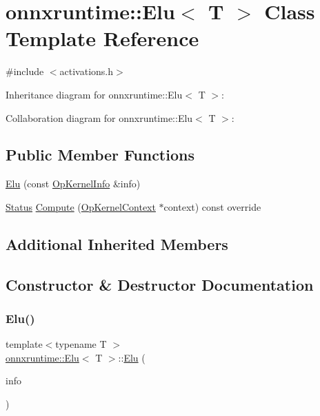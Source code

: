 \hypertarget{classonnxruntime_1_1Elu}{}\section{onnxruntime\+:\+:Elu$<$ T $>$ Class Template Reference}
\label{classonnxruntime_1_1Elu}


{\ttfamily \#include $<$activations.\+h$>$}



Inheritance diagram for onnxruntime\+:\+:Elu$<$ T $>$\+:


Collaboration diagram for onnxruntime\+:\+:Elu$<$ T $>$\+:
\subsection*{Public Member Functions}
\begin{DoxyCompactItemize}
\item 
\mbox{\hyperlink{classonnxruntime_1_1Elu_adbf3feaa7b80ff050938b399b7d8925c}{Elu}} (const \mbox{\hyperlink{classonnxruntime_1_1OpKernelInfo}{Op\+Kernel\+Info}} \&info)
\item 
\mbox{\hyperlink{classonnxruntime_1_1common_1_1Status}{Status}} \mbox{\hyperlink{classonnxruntime_1_1Elu_ac3f3a08e65865a0384448edffab016c5}{Compute}} (\mbox{\hyperlink{classonnxruntime_1_1OpKernelContext}{Op\+Kernel\+Context}} $\ast$context) const override
\end{DoxyCompactItemize}
\subsection*{Additional Inherited Members}


\subsection{Constructor \& Destructor Documentation}
\mbox{\label{classonnxruntime_1_1Elu_adbf3feaa7b80ff050938b399b7d8925c}} 
\subsubsection{\texorpdfstring{Elu()}{Elu()}}
{\footnotesize\ttfamily template$<$typename T $>$ \\
\mbox{\hyperlink{classonnxruntime_1_1Elu}{onnxruntime\+::\+Elu}}$<$ T $>$\+::\mbox{\hyperlink{classonnxruntime_1_1Elu}{Elu}} (\begin{DoxyParamCaption}\item[{const \mbox{\hyperlink{classonnxruntime_1_1OpKernelInfo}{Op\+Kernel\+Info}} \&}]{info }\end{DoxyParamCaption})\hspace{0.3cm}{\ttfamily [inline]}}



